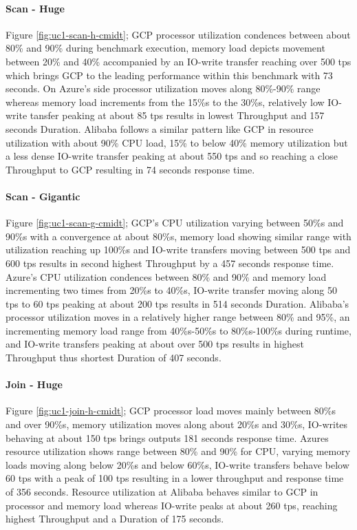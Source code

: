 \documentclass[review]{elsarticle}
\begin{document}
\paragraph{Scan - Huge} Figure \ref{fig:uc1-scan-h-cmidt}; GCP processor utilization condences between about 80\% and 90\% during benchmark execution, memory load depicts movement between 20\% and 40\% accompanied by an IO-write transfer reaching over 500 tps which brings GCP to the leading performance within this benchmark with 73 seconds. On Azure's side processor utilization moves along 80\%-90\% range whereas memory load increments from the 15\%s to the 30\%s, relatively low IO-write tansfer peaking at about 85 tps results in lowest Throughput and 157 seconds Duration. Alibaba follows a similar pattern like GCP in resource utilization with about 90\% CPU load, 15\% to below 40\% memory utilization but a less dense IO-write transfer peaking at about 550 tps and so reaching a close Throughput to GCP resulting in 74 seconds response time.

\paragraph{Scan - Gigantic} Figure \ref{fig:uc1-scan-g-cmidt}; GCP's CPU utilization varying between 50\%s and 90\%s with a convergence at about 80\%s, memory load showing similar range with utilization reaching up 100\%s and IO-write transfers moving between 500 tps and 600 tps results in second highest Throughput by a 457 seconds response time. Azure's CPU utilization condences between 80\% and 90\% and memory load incrementing two times from 20\%s to 40\%s, IO-write transfer moving along 50 tps to 60 tps peaking at about 200 tps results in 514 seconds Duration. Alibaba's processor utilization moves in a relatively higher range between 80\% and 95\%, an incrementing memory load range from 40\%s-50\%s to 80\%s-100\%s during runtime, and IO-write transfers peaking at about over 500 tps results in highest Throughput thus shortest Duration of 407 seconds.

\paragraph{Join - Huge} Figure \ref{fig:uc1-join-h-cmidt}; GCP processor load moves mainly between 80\%s and over 90\%s, memory utilization moves along about 20\%s and 30\%s, IO-writes behaving at about 150 tps brings outputs 181 seconds response time. Azures resource utilization shows range between 80\% and 90\% for CPU, varying memory loads moving along below 20\%s and below 60\%s, IO-write transfers behave below 60 tps with a peak of 100 tps resulting in a lower throughput and response time of 356 seconds. Resource utilization at Alibaba behaves similar to GCP in processor and memory load whereas IO-write peaks at about 260 tps, reaching highest Throughput and a Duration of 175 seconds.
\end{document}
